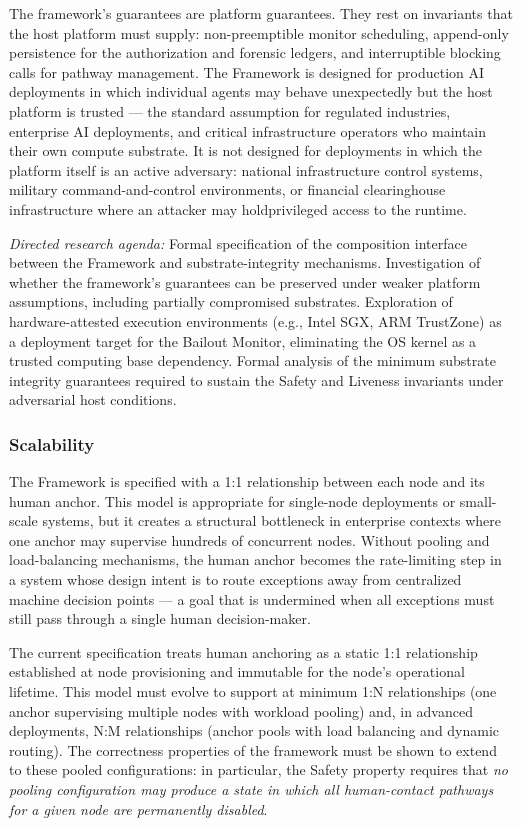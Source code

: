 The framework's guarantees are platform guarantees.  They rest on invariants
that the host platform must supply: non-preemptible monitor scheduling,
append-only persistence for the authorization and forensic ledgers, and
interruptible blocking calls for pathway management.  The \bxthree{} Framework
is designed for production AI deployments in which individual agents may behave
unexpectedly but the host platform is trusted --- the standard assumption for
regulated industries, enterprise AI deployments, and critical infrastructure
operators who maintain their own compute substrate.  It is not designed for
deployments in which the platform itself is an active adversary: national
infrastructure control systems, military command-and-control environments, or
financial clearinghouse infrastructure where an attacker may holdprivileged
access to the runtime.

\textit{Directed research agenda:} Formal specification of the composition
interface between the \bxthree{} Framework and substrate-integrity mechanisms.
Investigation of whether the framework's guarantees can be preserved under
weaker platform assumptions, including partially compromised substrates.
Exploration of hardware-attested execution environments (e.g., Intel SGX,
ARM TrustZone) as a deployment target for the Bailout Monitor, eliminating the
OS kernel as a trusted computing base dependency.  Formal analysis of the
minimum substrate integrity guarantees required to sustain the Safety and
Liveness invariants under adversarial host conditions.

\subsubsection{Scalability}\label{sec:scalability}

The \bxthree{} Framework is specified with a 1:1 relationship between each node
and its human anchor.  This model is appropriate for single-node deployments
or small-scale systems, but it creates a structural bottleneck in enterprise
contexts where one anchor may supervise hundreds of concurrent nodes.  Without
pooling and load-balancing mechanisms, the human anchor becomes the
rate-limiting step in a system whose design intent is to route exceptions away
from centralized machine decision points --- a goal that is undermined when
all exceptions must still pass through a single human decision-maker.

The current specification treats human anchoring as a static 1:1 relationship
established at node provisioning and immutable for the node's operational
lifetime.  This model must evolve to support at minimum 1:N relationships (one
anchor supervising multiple nodes with workload pooling) and, in advanced
deployments, N:M relationships (anchor pools with load balancing and dynamic
routing).  The correctness properties of the framework must be shown to extend
to these pooled configurations: in particular, the Safety property requires
that \emph{no pooling configuration may produce a state in which all
human-contact pathways for a given node are permanently disabled}.


